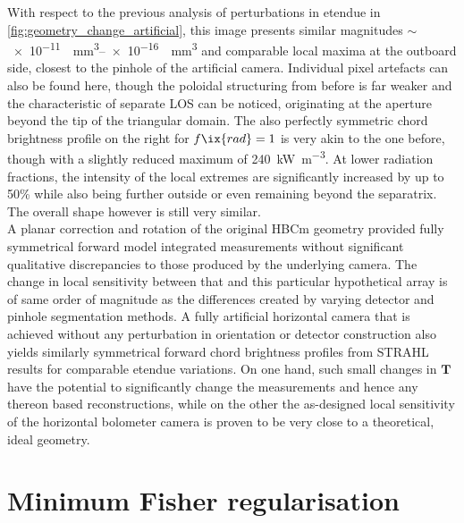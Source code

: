                 With respect to the previous analysis of perturbations in etendue in \cref{fig:geometry_change_artificial}, this image presents similar magnitudes $\sim$\SIrange[per-mode=reciprocal]{e-11}{e-16}{\per\cubic\milli\meter} and comparable local maxima at the outboard side, closest to the pinhole of the artificial camera. Individual pixel artefacts can also be found here, though the poloidal structuring from before is far weaker and the characteristic of separate LOS can be noticed, originating at the aperture beyond the tip of the triangular domain. The also perfectly symmetric chord brightness profile on the right for $f\ix{rad}=1$ is very akin to the one before, though with a slightly reduced maximum of \SI{240}{\kilo\watt\per\cubic\meter}. At lower radiation fractions, the intensity of the local extremes are significantly increased by up to 50\% while also being further outside or even remaining beyond the separatrix. The overall shape however is still very similar.\\%
                A planar correction and rotation of the original HBCm geometry provided fully symmetrical forward model integrated measurements without significant qualitative discrepancies to those produced by the underlying camera. The change in local sensitivity between that and this particular hypothetical array is of same order of magnitude as the differences created by varying detector and pinhole segmentation methods. A fully artificial horizontal camera that is achieved without any perturbation in orientation or detector construction also yields similarly symmetrical forward chord brightness profiles from STRAHL results for comparable etendue variations. On one hand, such small changes in $\mathbf{T}$ have the potential to significantly change the measurements and hence any thereon based reconstructions, while on the other the as-designed local sensitivity of the horizontal bolometer camera is proven to be very close to a theoretical, ideal geometry.%
%
    \section{Minimum Fisher regularisation}\label{apx:phantom}
%
